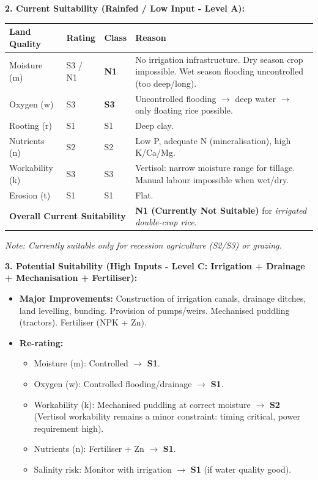 \documentclass[11pt]{article}
\begin{document}
\begin{exoresolu}
\noindent\textbf{2. Current Suitability (Rainfed / Low Input - Level A):}
\begin{center}
\begin{tabularx}{\linewidth}{|l|l|l|X|}\hline
\rowcolor{popblueL}
\textbf{Land Quality} & \textbf{Rating} & \textbf{Class} & \textbf{Reason} \\ \hline
Moisture (m) & S3 / N1 & \textbf{N1} & No irrigation infrastructure. Dry season crop impossible. Wet season flooding uncontrolled (too deep/long). \\ \hline
Oxygen (w) & S3 & \textbf{S3} & Uncontrolled flooding $\rightarrow$ deep water $\rightarrow$ only floating rice possible. \\ \hline
Rooting (r) & S1 & S1 & Deep clay. \\ \hline
Nutrients (n) & S2 & S2 & Low P, adequate N (mineralisation), high K/Ca/Mg. \\ \hline
Workability (k) & S3 & S3 & Vertisol: narrow moisture range for tillage. Manual labour impossible when wet/dry. \\ \hline
Erosion (t) & S1 & S1 & Flat. \\ \hline
\multicolumn{3}{|l|}{\textbf{Overall Current Suitability}} & \textbf{N1 (Currently Not Suitable)} for \emph{irrigated double-crop rice}. \\ \hline
\end{tabularx}
\end{center}
\textit{Note: Currently suitable only for recession agriculture (S2/S3) or grazing.}

\noindent\textbf{3. Potential Suitability (High Inputs - Level C: Irrigation + Drainage + Mechanisation + Fertiliser):}
\begin{itemize}
\item \textbf{Major Improvements:} Construction of irrigation canals, drainage ditches, land levelling, bunding. Provision of pumps/weirs. Mechanised puddling (tractors). Fertiliser (NPK + Zn).
\item \textbf{Re-rating:}
      \begin{itemize}
      \item Moisture (m): Controlled $\rightarrow$ \textbf{S1}.
      \item Oxygen (w): Controlled flooding/drainage $\rightarrow$ \textbf{S1}.
      \item Workability (k): Mechanised puddling at correct moisture $\rightarrow$ \textbf{S2} (Vertisol workability remains a minor constraint: timing critical, power requirement high).
      \item Nutrients (n): Fertiliser + Zn $\rightarrow$ \textbf{S1}.
      \item Salinity risk: Monitor with irrigation $\rightarrow$ \textbf{S1} (if water quality good).
      \end{itemize}
\end{itemize}


\end{exoresolu}
\end{document}
